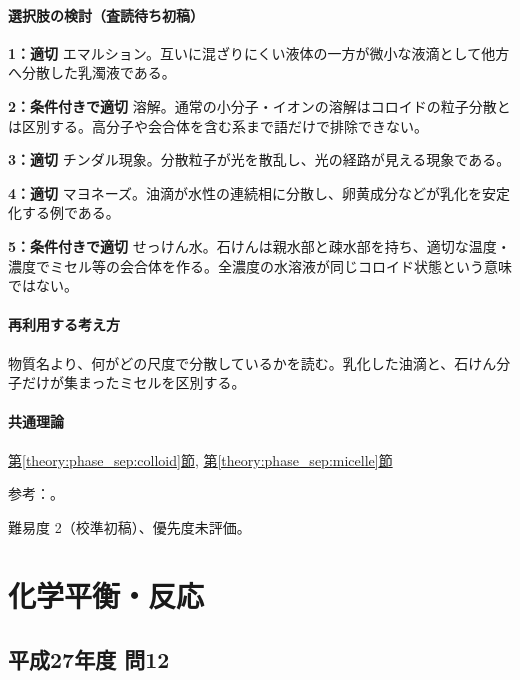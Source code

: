 \paragraph{選択肢の検討（査読待ち初稿）}\mbox{}\par

\noindent\textbf{1：適切} エマルション。互いに混ざりにくい液体の一方が微小な液滴として他方へ分散した乳濁液である。\par

\noindent\textbf{2：条件付きで適切} 溶解。通常の小分子・イオンの溶解はコロイドの粒子分散とは区別する。高分子や会合体を含む系まで語だけで排除できない。\par

\noindent\textbf{3：適切} チンダル現象。分散粒子が光を散乱し、光の経路が見える現象である。\par

\noindent\textbf{4：適切} マヨネーズ。油滴が水性の連続相に分散し、卵黄成分などが乳化を安定化する例である。\par

\noindent\textbf{5：条件付きで適切} せっけん水。石けんは親水部と疎水部を持ち、適切な温度・濃度でミセル等の会合体を作る。全濃度の水溶液が同じコロイド状態という意味ではない。\par

\paragraph{再利用する考え方} 物質名より、何がどの尺度で分散しているかを読む。乳化した油滴と、石けん分子だけが集まったミセルを区別する。

\paragraph{共通理論} \hyperref[theory:phase_sep:colloid]{第\ref*{theory:phase_sep:colloid}節}, \hyperref[theory:phase_sep:micelle]{第\ref*{theory:phase_sep:micelle}節}

\par 参考：\cite{openstax_colloids}。

\par 難易度 2（校準初稿）、優先度未評価。

\section{化学平衡・反応}

\subsection{平成27年度 問12}
\label{q:h27-reg-applied-12}

